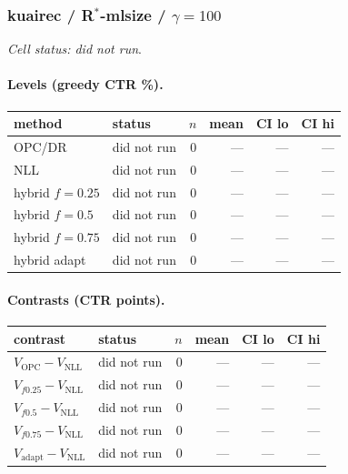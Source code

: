 \documentclass[10pt,a4paper]{article}
\begin{document}
\subsubsection{kuairec / R$^*$-mlsize / $\gamma=100$}
\emph{Cell status: did not run}.
\paragraph{Levels (greedy CTR \%).}
{\centering\small\begin{tabular}{llrrrr}
\toprule method & status & $n$ & mean & CI lo & CI hi \\
\midrule
OPC/DR & did not run & 0 & --- & --- & --- \\
NLL & did not run & 0 & --- & --- & --- \\
hybrid $f{=}0.25$ & did not run & 0 & --- & --- & --- \\
hybrid $f{=}0.5$ & did not run & 0 & --- & --- & --- \\
hybrid $f{=}0.75$ & did not run & 0 & --- & --- & --- \\
hybrid adapt & did not run & 0 & --- & --- & --- \\
\bottomrule\end{tabular}\par}
\paragraph{Contrasts (CTR points).}
{\centering\small\begin{tabular}{llrrrr}
\toprule contrast & status & $n$ & mean & CI lo & CI hi \\
\midrule
$V_{\mathrm{OPC}}-V_{\mathrm{NLL}}$ & did not run & 0 & --- & --- & --- \\
$V_{f0.25}-V_{\mathrm{NLL}}$ & did not run & 0 & --- & --- & --- \\
$V_{f0.5}-V_{\mathrm{NLL}}$ & did not run & 0 & --- & --- & --- \\
$V_{f0.75}-V_{\mathrm{NLL}}$ & did not run & 0 & --- & --- & --- \\
$V_{\mathrm{adapt}}-V_{\mathrm{NLL}}$ & did not run & 0 & --- & --- & --- \\
\bottomrule\end{tabular}\par}
\end{document}
